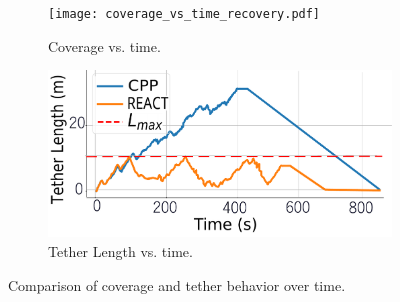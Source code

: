 \begin{figure}[t]
    \centering
    \begin{subfigure}[b]{0.48\linewidth}
        \centering
        \texttt{[image: coverage\_vs\_time\_recovery.pdf]}
        \caption{ Coverage vs. time.}
        \label{fig:coverage_vs_time}
    \end{subfigure}
    \hfill
    \begin{subfigure}[b]{0.48\linewidth}
        \centering
        \includegraphics[width=\linewidth]{EA-Planner/figures/tether_length_vs_time_with_recovery.pdf}
        \caption{Tether Length vs. time.}
        \label{fig:tether_vs_time}
    \end{subfigure}
    \caption{Comparison of coverage and tether behavior over time.}
    \label{fig:coverage_tether_sidebyside}
\end{figure}


